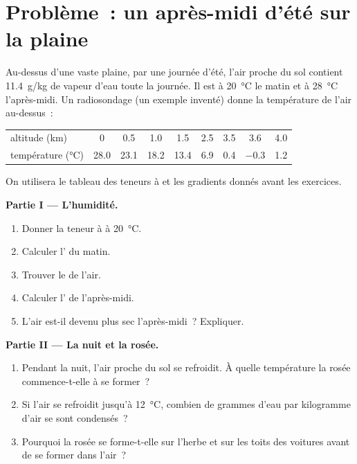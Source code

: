 \section{Problème~: un après-midi d'été sur la plaine}

\begin{problem}
\label{pb:g10:why-clouds-form:1}
Au-dessus d'une vaste plaine, par une journée d'été, l'air proche du sol
contient \qty{11.4}{g/kg} de vapeur d'eau toute la journée. Il est à
\qty{20}{\degreeCelsius} le matin et à \qty{28}{\degreeCelsius}
l'après-midi. Un radiosondage (un exemple inventé) donne la température de
l'air au-dessus~:

\begin{center}
\small
\begin{tabular}{l*{8}{c}}
\hline
altitude (km) & 0 & 0.5 & 1.0 & 1.5 & 2.5 & 3.5 & 3.6 & 4.0 \\
température (\unit{\degreeCelsius}) & 28.0 & 23.1 & 18.2 & 13.4 & 6.9 & 0.4 & $-0.3$ & 1.2 \\
\hline
\end{tabular}
\end{center}

\noindent On utilisera le tableau des teneurs à  et les gradients
donnés avant les exercices.

\medskip
\noindent\textbf{Partie I --- L'humidité.}
\begin{enumerate}
  \item Donner la teneur à  à \qty{20}{\degreeCelsius}.
  \item Calculer l' du matin.
  \item Trouver le  de l'air.
  \item Calculer l' de l'après-midi.
  \item L'air est-il devenu plus sec l'après-midi~? Expliquer.
\end{enumerate}

\medskip
\noindent\textbf{Partie II --- La nuit et la rosée.}
\begin{enumerate}[resume]
  \item Pendant la nuit, l'air proche du sol se refroidit. À quelle
        température la rosée commence-t-elle à se former~?
  \item Si l'air se refroidit jusqu'à \qty{12}{\degreeCelsius}, combien de
        grammes d'eau par kilogramme d'air se sont condensés~?
  \item Pourquoi la rosée se forme-t-elle sur l'herbe et sur les toits des
        voitures avant de se former dans l'air~?
\end{enumerate}


\end{problem}
